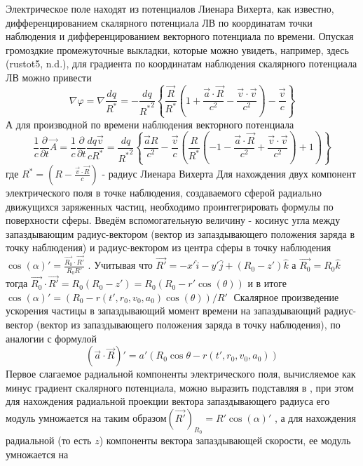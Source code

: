 ﻿\documentclass{article}
\begin{document}
Электрическое поле находят из потенциалов Лиенара Вихерта, как известно, дифференцированием скалярного потенциала ЛВ по координатам точки наблюдения и дифференцированием векторного потенциала по времени. Опуская громоздкие промежуточные выкладки, которые можно увидеть, например, здесь (rustot5, n.d.), для градиента по координатам наблюдения скалярного потенциала ЛВ можно привести
	\[\nabla \varphi =\nabla \frac{dq}{{{R}^{*}}}=-\frac{dq}{{{R}^{*}}^{2}}\left\{ \frac{\overrightarrow{R}}{{{R}^{*}}}\left( 1+\frac{\overrightarrow{a}\cdot \overrightarrow{R}}{{{c}^{2}}}-\frac{\overrightarrow{v}\cdot \overrightarrow{v}}{{{c}^{2}}} \right)-\frac{\overrightarrow{v}}{c} \right\}\] 	
А для производной по времени наблюдения векторного потенциала 
	\[\frac{1}{c}\frac{\partial }{\partial t}\overrightarrow{A}=\frac{1}{c}\frac{\partial }{\partial t}\frac{dq\overrightarrow{v}}{c{{R}^{*}}}=\frac{dq}{{{R}^{*}}^{2}}\left\{ \frac{\overrightarrow{a}R}{{{c}^{2}}}-\frac{\overrightarrow{v}}{c}\left( \frac{R}{{{R}^{*}}}\left( -1-\frac{\overrightarrow{a}\cdot \overrightarrow{R}}{{{c}^{2}}}+\frac{\overrightarrow{v}\cdot \overrightarrow{v}}{{{c}^{2}}} \right)+1 \right) \right\}\] 	
где ${{R}^{*}}=\left( R-\frac{\overrightarrow{v}\cdot \overrightarrow{R}}{c} \right)$ - радиус Лиенара Вихерта
Для нахождения двух компонент электрического поля в точке наблюдения, создаваемого сферой радиально движущихся заряженных частиц, необходимо проинтегрировать формулы по поверхности сферы.
Введём вспомогательную величину - косинус угла между запаздывающим радиус-вектором (вектор из запаздывающего положения заряда в точку наблюдения) и радиус-вектором из центра сферы в точку наблюдения $\cos \left( \alpha  \right)'=\frac{\overrightarrow{{{R}_{0}}}\cdot \overrightarrow{R'}}{{{R}_{0}}R'}$ . Учитывая что $\overrightarrow{R'}=-x'\widehat{i}-y'\widehat{j}+\left( {{R}_{0}}-z' \right)\widehat{k}$ а  $\overrightarrow{{{R}_{0}}}={{R}_{0}}\widehat{k}$тогда $\overrightarrow{{{R}_{0}}}\cdot \overrightarrow{R'}={{R}_{0}}\left( {{R}_{0}}-z' \right)={{R}_{0}}\left( {{R}_{0}}-r'\cos \left( \theta  \right) \right)$ и в итоге
	$\cos \left( \alpha  \right)'={\left( {{R}_{0}}-r\left( t',{{r}_{0}},{{v}_{0}},{{a}_{0}} \right)\cos \left( \theta  \right) \right)}/{R'}\;$ 	
Скалярное произведение ускорения частицы в запаздывающий момент времени на запаздывающий радиус-вектор (вектор из запаздывающего положения заряда в точку наблюдения), по аналогии с формулой 
	\[\left( \overrightarrow{a}\cdot \overrightarrow{R} \right)'=a'\left( {{R}_{0}}\cos \theta -r\left( t',{{r}_{0}},{{v}_{0}},{{a}_{0}} \right) \right)\] 	
Первое слагаемое радиальной компоненты электрического поля, вычисляемое как минус градиент скалярного потенциала, можно выразить подставляя  в  , при этом для нахождения радиальной проекции вектора запаздывающего радиуса его модуль умножается на  таким образом${{\left( \overrightarrow{R'} \right)}_{{{R}_{0}}}}=R'\cos \left( \alpha  \right)'$ , а для нахождения радиальной (то есть $z$) компоненты вектора запаздывающей скорости, ее модуль умножается на 
\end{document}
